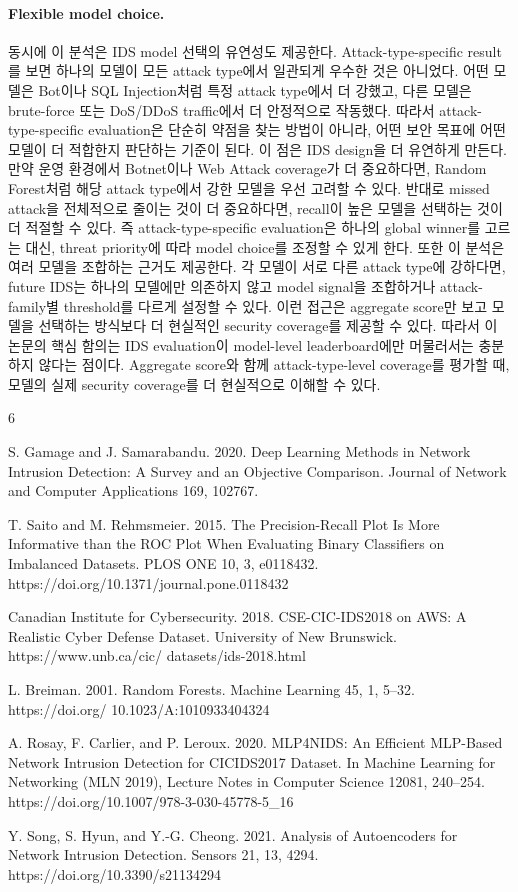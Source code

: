 \documentclass[sigconf,nonacm]{acmart}
\begin{document}
\paragraph{Flexible model choice.}
동시에 이 분석은 IDS model 선택의 유연성도 제공한다.
Attack-type-specific result를 보면 하나의 모델이 모든 attack type에서 일관되게 우수한 것은 아니었다.
어떤 모델은 Bot이나 SQL Injection처럼 특정 attack type에서 더 강했고, 다른 모델은 brute-force 또는 DoS/DDoS traffic에서 더 안정적으로 작동했다.
따라서 attack-type-specific evaluation은 단순히 약점을 찾는 방법이 아니라, 어떤 보안 목표에 어떤 모델이 더 적합한지 판단하는 기준이 된다. 이 점은 IDS design을 더 유연하게 만든다.
만약 운영 환경에서 Botnet이나 Web Attack coverage가 더 중요하다면, Random Forest처럼 해당 attack type에서 강한 모델을 우선 고려할 수 있다.
반대로 missed attack을 전체적으로 줄이는 것이 더 중요하다면, recall이 높은 모델을 선택하는 것이 더 적절할 수 있다.
즉 attack-type-specific evaluation은 하나의 global winner를 고르는 대신, threat priority에 따라 model choice를 조정할 수 있게 한다. 또한 이 분석은 여러 모델을 조합하는 근거도 제공한다.
각 모델이 서로 다른 attack type에 강하다면, future IDS는 하나의 모델에만 의존하지 않고 model signal을 조합하거나 attack-family별 threshold를 다르게 설정할 수 있다.
이런 접근은 aggregate score만 보고 모델을 선택하는 방식보다 더 현실적인 security coverage를 제공할 수 있다.
따라서 이 논문의 핵심 함의는 IDS evaluation이 model-level leaderboard에만 머물러서는 충분하지 않다는 점이다.
Aggregate score와 함께 attack-type-level coverage를 평가할 때, 모델의 실제 security coverage를 더 현실적으로 이해할 수 있다.

\clearpage

\begin{thebibliography}{6}

S. Gamage and J. Samarabandu. 2020. Deep Learning Methods in Network Intrusion Detection: A Survey and an Objective Comparison. Journal of Network and
Computer Applications 169, 102767.

T. Saito and M. Rehmsmeier. 2015. The Precision-Recall Plot Is More Informative
than the ROC Plot When Evaluating Binary Classifiers on Imbalanced Datasets.
PLOS ONE 10, 3, e0118432. https://doi.org/10.1371/journal.pone.0118432

Canadian Institute for Cybersecurity. 2018. CSE-CIC-IDS2018 on AWS: A Realistic
Cyber Defense Dataset. University of New Brunswick. https://www.unb.ca/cic/
datasets/ids-2018.html

L. Breiman. 2001. Random Forests. Machine Learning 45, 1, 5--32. https://doi.org/
10.1023/A:1010933404324

A. Rosay, F. Carlier, and P. Leroux. 2020. MLP4NIDS: An Efficient MLP-Based
Network Intrusion Detection for CICIDS2017 Dataset. In Machine Learning for
Networking (MLN 2019), Lecture Notes in Computer Science 12081, 240--254.
https://doi.org/10.1007/978-3-030-45778-5\_16

Y. Song, S. Hyun, and Y.-G. Cheong. 2021. Analysis of Autoencoders for Network
Intrusion Detection. Sensors 21, 13, 4294. https://doi.org/10.3390/s21134294

\end{thebibliography}
\end{document}
